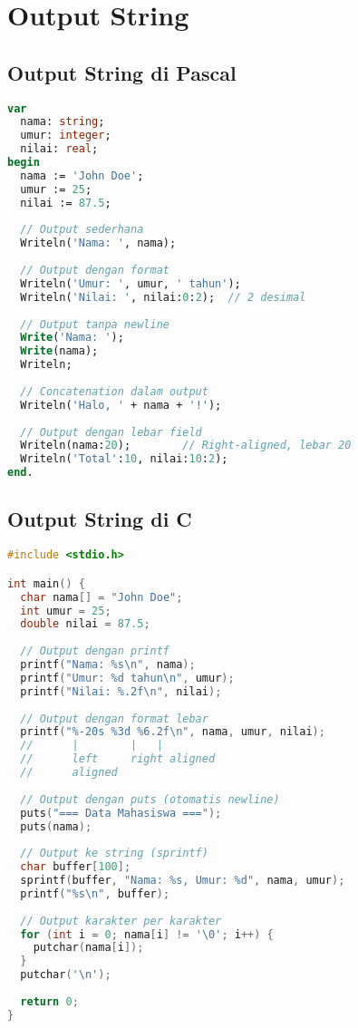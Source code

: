 \documentclass[../main.tex]{subfiles}
\begin{document}
\section{Output String}

\subsection{Output String di Pascal}

\begin{lstlisting}[language=Pascal, caption={Output string di Pascal}]
var
  nama: string;
  umur: integer;
  nilai: real;
begin
  nama := 'John Doe';
  umur := 25;
  nilai := 87.5;
  
  // Output sederhana
  Writeln('Nama: ', nama);
  
  // Output dengan format
  Writeln('Umur: ', umur, ' tahun');
  Writeln('Nilai: ', nilai:0:2);  // 2 desimal
  
  // Output tanpa newline
  Write('Nama: ');
  Write(nama);
  Writeln;
  
  // Concatenation dalam output
  Writeln('Halo, ' + nama + '!');
  
  // Output dengan lebar field
  Writeln(nama:20);        // Right-aligned, lebar 20
  Writeln('Total':10, nilai:10:2);
end.
\end{lstlisting}

\subsection{Output String di C}

\begin{lstlisting}[language=C, caption={Output string di C}]
#include <stdio.h>

int main() {
  char nama[] = "John Doe";
  int umur = 25;
  double nilai = 87.5;
  
  // Output dengan printf
  printf("Nama: %s\n", nama);
  printf("Umur: %d tahun\n", umur);
  printf("Nilai: %.2f\n", nilai);
  
  // Output dengan format lebar
  printf("%-20s %3d %6.2f\n", nama, umur, nilai);
  //      |        |   |
  //      left     right aligned
  //      aligned  
  
  // Output dengan puts (otomatis newline)
  puts("=== Data Mahasiswa ===");
  puts(nama);
  
  // Output ke string (sprintf)
  char buffer[100];
  sprintf(buffer, "Nama: %s, Umur: %d", nama, umur);
  printf("%s\n", buffer);
  
  // Output karakter per karakter
  for (int i = 0; nama[i] != '\0'; i++) {
    putchar(nama[i]);
  }
  putchar('\n');
  
  return 0;
}
\end{lstlisting}
\end{document}
